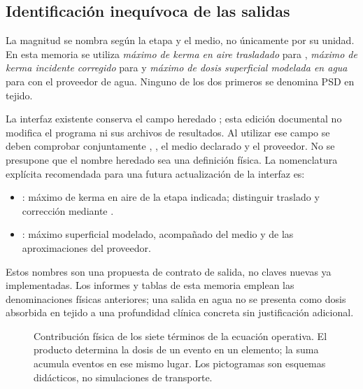 \subsection{Identificación inequívoca de las salidas}
La magnitud se nombra según la etapa y el medio, no únicamente por su unidad. En esta memoria se utiliza \emph{máximo de kerma en aire trasladado} para , \emph{máximo de kerma incidente corregido} para  y \emph{máximo de dosis superficial modelada en agua} para  con el proveedor de agua. Ninguno de los dos primeros se denomina PSD en tejido.

La interfaz existente conserva el campo heredado ; esta edición documental no modifica el programa ni sus archivos de resultados. Al utilizar ese campo se deben comprobar conjuntamente , , el medio declarado y el proveedor. No se presupone que el nombre heredado sea una definición física. La nomenclatura explícita recomendada para una futura actualización de la interfaz es:
\begin{itemize}[leftmargin=*]
\item {}: máximo de kerma en aire de la etapa indicada; distinguir traslado y corrección mediante .
\item {}: máximo superficial modelado, acompañado del medio y de las aproximaciones del proveedor.
\end{itemize}
Estos nombres son una propuesta de contrato de salida, no claves nuevas ya implementadas. Los informes y tablas de esta memoria emplean las denominaciones físicas anteriores; una salida en agua no se presenta como dosis absorbida en tejido a una profundidad clínica concreta sin justificación adicional.



\begin{figure}[htbp]\centering
\caption{Contribución física de los siete términos de la ecuación operativa. El producto determina la dosis de un evento en un elemento; la suma acumula eventos en ese mismo lugar. Los pictogramas son esquemas didácticos, no simulaciones de transporte.}\label{fig:ecuacion}\end{figure}

\FloatBarrier

